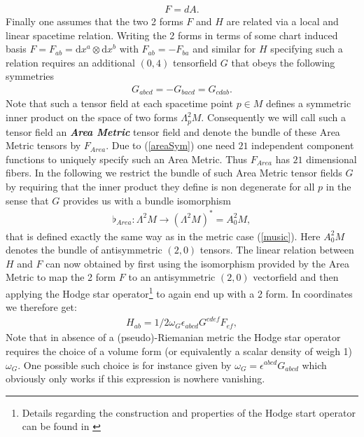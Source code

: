\documentclass[a4paper,12pt, DIV=14, BCOR=5mm, twoside, headsepline, numbers=noenddot]{scrbook}
\begin{document}
\begin{align}
    F = d A.
\end{align}
Finally one assumes that the two 2 forms $F$ and $H$ are related via a local and linear spacetime relation. Writing the 2 forms in terms of some chart induced basis $F = F_{ab} = \mathrm{d}x^a \otimes \mathrm{d}x^b$ with $F_{ab} = - F_{ba}$ and similar for $H$ specifying such a relation requires an additional $(0,4)$ tensorfield $G$ that obeys the following symmetries
\begin{align}\label{areaSym}
    G_{abcd} = -G_{bacd} = G_{cdab}.
\end{align}
Note that such a tensor field at each spacetime point $p\in M$ defines a symmetric inner product on the space of two forms $\Lambda^2_pM$. Consequently we will call such a tensor field an \textbf{\textit{Area Metric}} tensor field and denote the bundle of these Area Metric tensors by $F_{Area}$. Due to (\ref{areaSym}) one need $21$ independent component functions to uniquely specify such an Area Metric. Thus $F_{Area}$ has $21$ dimensional fibers.   In the following we restrict the bundle of such Area Metric tensor fields $G$ by requiring that the inner product they define is non degenerate for all $p$ in the sense that $G$ provides us with a bundle isomorphism 
\begin{align}
\flat_{Area} : \Lambda^2M \longrightarrow (\Lambda^2M)^{\ast} = A^2_0M,
\end{align}
that is defined exactly the same way as in the metric case (\ref{music}). Here $A^2_0M$ denotes the bundle of antisymmetric $(2,0)$ tensors. 
The linear relation between $H$ and $F$ can now obtained by first using the isomorphism provided by the Area Metric to map the 2 form $F$ to an antisymmetric $(2,0)$ vectorfield and then applying the Hodge star operator\footnote{Details regarding the construction and properties of the Hodge start operator can be found in \cite{Abraham:1988:MTA:50877}} to again end up with a 2 form. In coordinates we therefore get:
\begin{align}
    H_{ab} = 1/2 \omega_G \epsilon_{abcd} G^{cdef} F_{ef},
\end{align}
Note that in absence of a (pseudo)-Riemanian metric the Hodge star operator requires the choice of a volume form (or equivalently a scalar density of weigh 1) $\omega_G$. One possible such choice is for instance given by $\omega_G = \epsilon^{abcd}G_{abcd}$ which obviously only works if this expression is nowhere vanishing.
\end{document}

